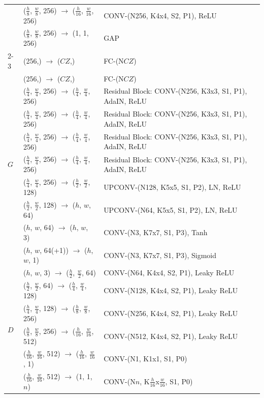 \documentclass[runningheads]{llncs}
\begin{document}
\begin{table}[!ht]
\begin{tabular}{@{}lll@{}}
		& ($\frac{h}{8}$, $\frac{w}{8}$, 256) $\rightarrow$ ($\frac{h}{16}$, $\frac{w}{16}$, 256) & CONV-(N256, K4x4, S2, P1), ReLU \\
		& ($\frac{h}{8}$, $\frac{w}{8}$, 256) $\rightarrow$ (1, 1, 256) & GAP \\ \cmidrule{2-3}
		& (256,) $\rightarrow$ ($CZ$,)  & FC-(N$CZ$) \\
		& (256,) $\rightarrow$ ($CZ$,)  & FC-(N$CZ$) \\
		\midrule
		\multirow{7}{*}{$G$} & ($\frac{h}{4}$, $\frac{w}{4}$, 256) $\rightarrow$ ($\frac{h}{4}$, $\frac{w}{4}$, 256) & Residual Block: CONV-(N256, K3x3, S1, P1), AdaIN, ReLU \\
		& ($\frac{h}{4}$, $\frac{w}{4}$, 256) $\rightarrow$ ($\frac{h}{4}$, $\frac{w}{4}$, 256) & Residual Block: CONV-(N256, K3x3, S1, P1), AdaIN, ReLU \\
		& ($\frac{h}{4}$, $\frac{w}{4}$, 256) $\rightarrow$ ($\frac{h}{4}$, $\frac{w}{4}$, 256) & Residual Block: CONV-(N256, K3x3, S1, P1), AdaIN, ReLU \\
		& ($\frac{h}{4}$, $\frac{w}{4}$, 256) $\rightarrow$ ($\frac{h}{4}$, $\frac{w}{4}$, 256) & Residual Block: CONV-(N256, K3x3, S1, P1), AdaIN, ReLU \\
		& ($\frac{h}{4}$, $\frac{w}{4}$, 256) $\rightarrow$ ($\frac{h}{2}$, $\frac{w}{2}$, 128) & UPCONV-(N128, K5x5, S1, P2), LN, ReLU \\ 
		& ($\frac{h}{2}$, $\frac{w}{2}$, 128) $\rightarrow$ ($h$, $w$, 64) & UPCONV-(N64, K5x5, S1, P2), LN, ReLU \\ 
		& (${h}$, ${w}$, 64) $\rightarrow$ (${h}$, ${w}$, 3) & CONV-(N3, K7x7, S1, P3), Tanh \\ 
		& \dag(${h}$, ${w}$, 64(+1)) $\rightarrow$ (${h}$, ${w}$, 1) & CONV-(N3, K7x7, S1, P3), Sigmoid \\ \midrule
		\multirow{6}{*}{$D$} & ($h$, $w$, 3) $\rightarrow$ ($\frac{h}{2}$, $\frac{w}{2}$, 64) & CONV-(N64, K4x4, S2, P1), Leaky ReLU \\
		& ($\frac{h}{2}$, $\frac{w}{2}$, 64) $\rightarrow$ ($\frac{h}{4}$, $\frac{w}{4}$, 128) & CONV-(N128, K4x4, S2, P1), Leaky ReLU \\
		& ($\frac{h}{4}$, $\frac{w}{4}$, 128) $\rightarrow$ ($\frac{h}{8}$, $\frac{w}{8}$, 256) & CONV-(N256, K4x4, S2, P1), Leaky ReLU \\
		& ($\frac{h}{8}$, $\frac{w}{8}$, 256) $\rightarrow$ ($\frac{h}{16}$, $\frac{w}{16}$, 512) & CONV-(N512, K4x4, S2, P1), Leaky ReLU \\  \cmidrule{2-3}
		& ($\frac{h}{16}$, $\frac{w}{16}$, 512) $\rightarrow$ ($\frac{h}{16}$, $\frac{w}{16}$, 1) & CONV-(N1, K1x1, S1, P0) \\ 
		& ($\frac{h}{16}$, $\frac{w}{16}$, 512) $\rightarrow$ (1, 1, $n$) & CONV-(N$n$, K$\frac{h}{16}$x$\frac{w}{16}$, S1, P0) \\ 
		\bottomrule
	\end{tabular}
	\label{tab:architecture}
\end{table}
\end{document}
